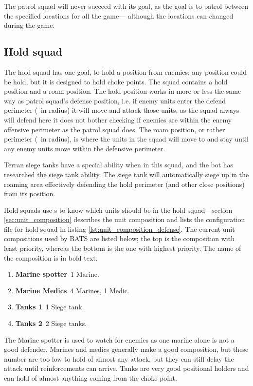 The patrol squad will never succeed with its goal, as the goal is to patrol between the specified locations for all the game— although the locations can changed during the game.


\subsection{Hold squad}
\label{sec:hold_squad}
The hold squad has one goal, to hold a position from enemies; any position could be hold, but it is designed to hold choke points. The squad contains a hold position and a roam position. The hold position works in more or less the same way as patrol squad's defense position, i.e. if enemy units enter the defend perimeter (\squadDefendDefendPerimeter~in radius) it will move and attack those units, as the squad always will defend here it does not bother checking if enemies are within the enemy offensive perimeter as the patrol squad does. The roam position, or rather perimeter (\squadDefendRoamPerimeter~in radius), is where the units in the squad will move to and stay until any enemy units move within the defensive perimeter.

Terran siege tanks have a special ability when in this squad, and the bot has researched the siege tank ability. The siege tank will automatically siege up in the roaming area effectively defending the hold perimeter (and other close positions) from its position.

Hold squads use s to know which units should be in the hold squad—section \ref{sec:unit_composition} describes the unit composition and lists the configuration file for hold squad in listing \ref{lst:unit_composition_defense}. The current unit compositions used by BATS are listed below; the top is the composition with least priority, whereas the bottom is the one with highest priority. The name of the composition is in bold text.

\begin{enumerate}
	\item \textbf{Marine spotter}~1 Marine.
	\item \textbf{Marine Medics}~4 Marines, 1 Medic.
	\item \textbf{Tanks 1}~1 Siege tank.
	\item \textbf{Tanks 2}~2 Siege tanks.
\end{enumerate}
The Marine spotter is used to watch for enemies as one marine alone is not a good defender. Marines and medics generally make a good composition, but these number are too low to hold of almost any attack, but they can still delay the attack until reinforcements can arrive. Tanks are very good positional holders and can hold of almost anything coming from the choke point. 

